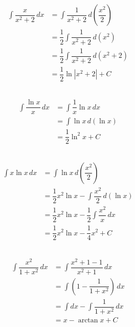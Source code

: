 \documentclass{scrartcl}
\begin{document}
\subsection{}

\begin{align*}
\displaystyle \int \dfrac{x}{x^2+2}\,dx
&= \int \dfrac{1}{x^2+2}\,d\left(\dfrac{x^2}{2}\right) \\
&= \dfrac{1}{2} \int \dfrac{1}{x^2+2}\,d(x^2) \\
&= \dfrac{1}{2} \int \dfrac{1}{x^2+2}\,d(x^2+2) \\
&= \dfrac{1}{2}\ln|x^2+2| + C
\end{align*}

\subsection{}

\begin{align*}
\displaystyle \int \dfrac{\ln x}{x}\,dx
&= \int\dfrac{1}{x} \ln x \,dx \\
&= \int \ln x \, d(\ln x) \\
&= \dfrac{1}{2} \ln^2x + C
\end{align*}

\subsection{}

\begin{align*}
\displaystyle \int x \ln x\,dx
&= \int\ln x \,d\left( \dfrac{x^2}{2} \right) \\
&= \dfrac{1}{2} x^2 \ln x - \int \dfrac{x^2}{2} \, d(\ln x) \\
&= \dfrac{1}{2} x^2 \ln x - \dfrac{1}{2} \int \dfrac{x^2}{x} \, dx \\
&= \dfrac{1}{2} x^2 \ln x - \dfrac{1}{4} x^2 + C
\end{align*}

\subsection{}

\begin{align*}
\displaystyle \int \dfrac{x^2}{1+x^2}\,dx
&= \int \dfrac{x^2+1-1}{x^2+1} \,dx\\
&= \int \left(1 - \dfrac{1}{1+x^2}\right) \,dx\\
&= \int dx - \int \dfrac{1}{1+x^2} \,dx\\
&= x - \arctan{x} + C
\end{align*}
\end{document}
